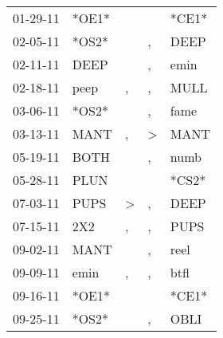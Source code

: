 \begin{supertabular}{p{0.07\textwidth}p{0.06\textwidth}p{0.02\textwidth}p{0.02\textwidth}p{0.06\textwidth}}
          01-29-11\textsuperscript{} &                            *OE1* &                  &                  &                            *CE1* \\
          02-05-11\textsuperscript{} &                            *OS2* &                  &                , &           DEEP\textsuperscript{} \\
          02-11-11\textsuperscript{} &           DEEP\textsuperscript{} &                  &                , &           emin\textsuperscript{} \\
          02-18-11\textsuperscript{} &           peep\textsuperscript{} &                , &                , &           MULL\textsuperscript{} \\
          03-06-11\textsuperscript{} &                            *OS2* &                  &                , &           fame\textsuperscript{} \\
          03-13-11\textsuperscript{} &           MANT\textsuperscript{} &                , &     \textgreater &           MANT\textsuperscript{} \\
          05-19-11\textsuperscript{} &           BOTH\textsuperscript{} &                  &                , &           numb\textsuperscript{} \\
          05-28-11\textsuperscript{} &           PLUN\textsuperscript{} &                  &                  &                            *CS2* \\
          07-03-11\textsuperscript{} &           PUPS\textsuperscript{} &     \textgreater &                , &           DEEP\textsuperscript{} \\
          07-15-11\textsuperscript{} &            2X2\textsuperscript{} &                , &                , &           PUPS\textsuperscript{} \\
          09-02-11\textsuperscript{} &           MANT\textsuperscript{} &                  &                , &           reel\textsuperscript{} \\
          09-09-11\textsuperscript{} &           emin\textsuperscript{} &                , &                , &           btfl\textsuperscript{} \\
          09-16-11\textsuperscript{} &                            *OE1* &                  &                  &                            *CE1* \\
          09-25-11\textsuperscript{} &                            *OS2* &                  &                , &           OBLI\textsuperscript{} \\

\end{supertabular}
